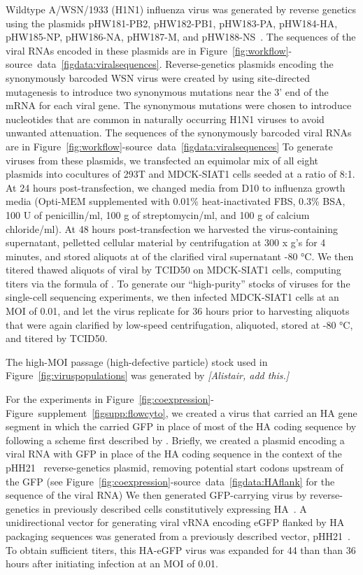 \documentclass[9pt,lineno]{elife}
\newcommand{\jdbcomment}[1]{\emph{\color{red} [#1]}}
\begin{document}
Wildtype A/WSN/1933 (H1N1) influenza virus was generated by reverse genetics using the plasmids pHW181-PB2, pHW182-PB1, pHW183-PA, pHW184-HA, pHW185-NP, pHW186-NA, pHW187-M, and pHW188-NS~\citep{hoffmann2000dna}.
The sequences of the viral RNAs encoded in these plasmids are in Figure~\ref{fig:workflow}-source~data~\ref{figdata:viralsequences}.
Reverse-genetics plasmids encoding the synonymously barcoded WSN virus were created by using site-directed mutagenesis to introduce two synonymous mutations near the 3' end of the mRNA for each viral gene.
The synonymous mutations were chosen to introduce nucleotides that are common in naturally occurring H1N1 viruses to avoid unwanted attenuation.
The sequences of the synonymously barcoded viral RNAs are in Figure~\ref{fig:workflow}-source~data~\ref{figdata:viralsequences}
To generate viruses from these plasmids, we transfected an equimolar mix of all eight plasmids into cocultures of 293T and MDCK-SIAT1 cells seeded at a ratio of 8:1. 
At 24 hours post-transfection, we changed media from D10 to influenza growth media (Opti-MEM supplemented with 0.01\% heat-inactivated FBS, 0.3\% BSA, 100 U of penicillin/ml, 100  \si{\micro}g of streptomycin/ml, and 100 \si{\micro}g of calcium chloride/ml).
At 48 hours post-transfection we harvested the virus-containing supernatant, pelletted cellular material by centrifugation at 300 x g's for 4 minutes, and stored aliquots at of the clarified viral supernatant -80 \si{\degreeCelsius }. 
We then titered thawed aliquots of viral by TCID50 on MDCK-SIAT1 cells, computing titers via the formula of \citet{reed1938simple}.
To generate our ``high-purity'' stocks of viruses for the single-cell sequencing experiments, we then infected MDCK-SIAT1 cells at an MOI of 0.01, and let the virus replicate for 36 hours prior to harvesting aliquots that were again clarified by low-speed centrifugation, aliquoted, stored at -80  \si{\degreeCelsius }, and titered by TCID50.

The high-MOI passage (high-defective particle) stock used in Figure~\ref{fig:viruspopulations} was generated by \jdbcomment{Alistair, add this.}

For the experiments in Figure~\ref{fig:coexpression}-Figure~supplement~\ref{figsupp:flowcyto}, we created a virus that carried an HA gene segment in which the carried GFP in place of most of the HA coding sequence by following a scheme first described by \citet{marsh2007specific}.
Briefly, we created a plasmid encoding a viral RNA with GFP in place of the HA coding sequence in the context of the pHH21~\citep{Neumann:1999ws} reverse-genetics plasmid, removing potential start codons upstream of the GFP (see Figure~\ref{fig:coexpression}-source~data~\ref{figdata:HAflank} for the sequence of the viral RNA)
We then generated GFP-carrying virus by reverse-genetics in previously described cells constitutively expressing HA~\citep{Doud:2016gm}.
A unidirectional vector for generating viral vRNA encoding eGFP flanked by HA packaging sequences was generated from a previously described vector, pHH21~\citep{Neumann:1999ws}. 
To obtain sufficient titers, this HA-eGFP virus was expanded for 44 than than 36 hours after initiating infection at an MOI of 0.01.
\end{document}
